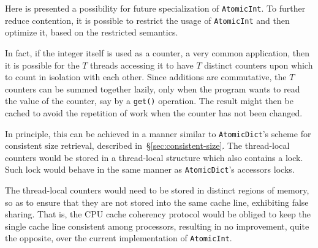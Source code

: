 Here is presented a possibility for future specialization of \texttt{AtomicInt}.
To further reduce contention, it is possible to restrict the usage of \texttt{AtomicInt} and then optimize it, based on the restricted semantics.

In fact, if the integer itself is used as a counter, a very common application, then it is possible for the $T$ threads accessing it to have $T$ distinct counters upon which to count in isolation with each other.
Since additions are commutative, the $T$ counters can be summed together lazily, only when the program wants to read the value of the counter, say by a \texttt{{get()}} operation.
The result might then be cached to avoid the repetition of work when the counter has not been changed.

In principle, this can be achieved in a manner similar to \texttt{AtomicDict}'s scheme for consistent size retrieval, described in~\S\ref{sec:consistent-size}.
The thread-local counters would be stored in a thread-local structure which also contains a lock.
Such lock would behave in the same manner as \texttt{AtomicDict}'s accessors locks.

The thread-local counters would need to be stored in distinct regions of memory, so as to ensure that they are not stored into the same cache line, exhibiting false sharing.
That is, the CPU cache coherency protocol would be obliged to keep the single cache line consistent among processors, resulting in no improvement, quite the opposite, over the current implementation of \texttt{AtomicInt}.
